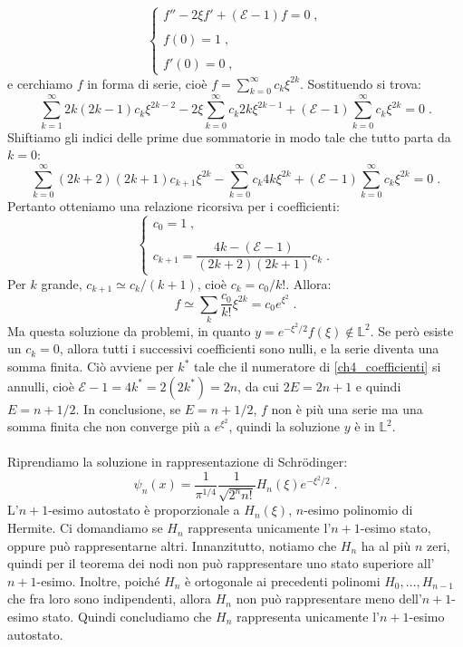 \documentclass[12pt,a4paper]{report}
\theoremstyle{definition}
\numberwithin{equation}{section}
\newcommand{\Sch}{Schrödinger}
\begin{document}
\begin{equation}
\begin{cases}
f''-2\xi f'+(\mathcal{E}-1)f=0\;, \\
\\
f(0)=1\;, \\
\\
f'(0)=0\;,
\end{cases}
\end{equation}
e cerchiamo $f$ in forma di serie, cioè $f=\sum_{k=0}^{\infty} c_k\xi^{2k}$. Sostituendo si trova:
$$
\sum_{k=1}^{\infty} 2k(2k-1)c_k\xi^{2k-2}-2\xi\sum_{k=0}^{\infty}c_k 2k\xi^{2k-1}+(\mathcal{E}-1)\sum_{k=0}^{\infty} c_k \xi^{2k}=0\;.
$$
Shiftiamo gli indici delle prime due sommatorie in modo tale che tutto parta da $k=0$:
$$
\sum_{k=0}^{\infty} (2k+2)(2k+1)c_{k+1}\xi^{2k}-\sum_{k=0}^{\infty}c_k 4k\xi^{2k}+(\mathcal{E}-1)\sum_{k=0}^{\infty} c_k\xi^{2k}=0\;.
$$
Pertanto otteniamo una relazione ricorsiva per i coefficienti:
\begin{equation}
\begin{cases}
c_0=1\;, \\
\\
c_{k+1}=\dfrac{4k-(\mathcal{E}-1)}{(2k+2)(2k+1)}c_k\;.
\end{cases} \label{ch4_coefficienti}
\end{equation}
Per $k$ grande, $c_{k+1}\simeq c_k/(k+1)$, cioè $c_k=c_0/k!$. Allora:
$$
f\simeq \sum_k \frac{c_0}{k!}\xi^{2k}=c_0e^{\xi^2}\;.
$$
Ma questa soluzione da problemi, in quanto $y=e^{-\xi^2/2}f(\xi)\not\in\mathbb{L}^2$. Se però esiste un $c_k=0$, allora tutti i successivi coefficienti sono nulli, e la serie diventa una somma finita. Ciò avviene per $k^*$ tale che il numeratore di \eqref{ch4_coefficienti} si annulli, cioè $\mathcal{E}-1=4k^*=2(2k^*)=2n$, da cui $2E=2n+1$ e quindi $E=n+1/2$. In conclusione, se $E=n+1/2$, $f$ non è più una serie ma una somma finita che non converge più a $e^{\xi^2}$, quindi la soluzione $y$ è in $\mathbb{L}^2$. \\
\\
Riprendiamo la soluzione in rappresentazione di \Sch:
\begin{equation}
\psi_n(x)=\frac{1}{\pi^{1/4}}\frac{1}{\sqrt{2^n n!}}H_n(\xi)e^{-\xi^2/2}\;.
\end{equation}
L'$n+1$-esimo autostato è proporzionale a $H_n(\xi)$, $n$-esimo polinomio di Hermite. Ci domandiamo se $H_n$ rappresenta unicamente l'$n+1$-esimo stato, oppure può rappresentarne altri. Innanzitutto, notiamo che $H_n$ ha al più $n$ zeri, quindi per il teorema dei nodi non può rappresentare uno stato superiore all'$n+1$-esimo. Inoltre, poiché $H_n$ è ortogonale ai precedenti polinomi $H_0,\ldots,H_{n-1}$ che fra loro sono indipendenti, allora $H_n$ non può rappresentare meno dell'$n+1$-esimo stato. Quindi concludiamo che $H_n$ rappresenta unicamente l'$n+1$-esimo autostato. \\
\end{document}
